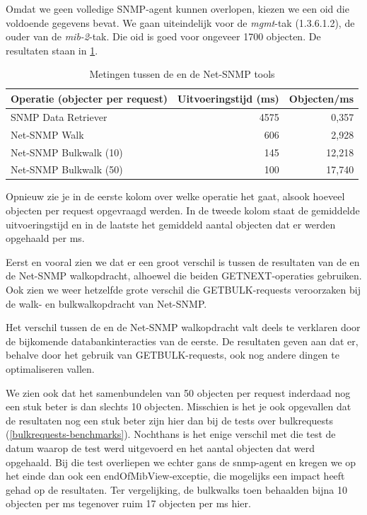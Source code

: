 Omdat we geen volledige SNMP-agent kunnen overlopen, kiezen we een \gls{oid} die voldoende gegevens bevat.
We gaan uiteindelijk voor de \textit{mgmt}-tak (1.3.6.1.2), de ouder van de \textit{mib-2}-tak.
Die \gls{oid} is goed voor ongeveer 1700 objecten.
De resultaten staan in \cref{tabel-nwmretriever-vs-net-snmp}.

\begin{table}[h]
\centering
\begin{tabular}{@{}lrr@{}}
\toprule
Operatie (objecter per request) & Uitvoeringstijd (ms) & Objecten/ms \\ \midrule
SNMP Data Retriever             & 4575                 & 0,357       \\
Net-SNMP Walk                   & 606                  & 2,928       \\
Net-SNMP Bulkwalk (10)          & 145                  & 12,218      \\
Net-SNMP Bulkwalk (50)          & 100                  & 17,740      \\ \bottomrule
\end{tabular}
\caption{Metingen tussen de \nwmretriever{} en de Net-SNMP tools}
\label{tabel-nwmretriever-vs-net-snmp}
\end{table}

Opnieuw zie je in de eerste kolom over welke operatie het gaat, alsook hoeveel objecten per request opgevraagd werden.
In de tweede kolom staat de gemiddelde uitvoeringstijd en in de laatste het gemiddeld aantal objecten dat er werden opgehaald per ms.

Eerst en vooral zien we dat er een groot verschil is tussen de resultaten van de \nwmretriever{}
en de Net-SNMP walkopdracht, alhoewel die beiden GETNEXT-operaties gebruiken.
Ook zien we weer hetzelfde grote verschil die GETBULK-requests veroorzaken bij de walk- en bulkwalkopdracht van Net-SNMP.

Het verschil tussen de \nwmretriever{} en de Net-SNMP walkopdracht valt deels te verklaren door de bijkomende databankinteracties van de eerste.
De resultaten geven aan dat er, behalve door het gebruik van GETBULK-requests, ook nog andere dingen te optimaliseren vallen.

We zien ook dat het samenbundelen van 50 objecten per request inderdaad nog een stuk beter is dan slechts 10 objecten.
Misschien is het je ook opgevallen dat de resultaten nog een stuk beter zijn hier dan bij de tests over bulkrequests (\cref{bulkrequests-benchmarks}).
Nochthans is het enige verschil met die test de datum waarop de test werd uitgevoerd en het aantal objecten dat werd opgehaald.
Bij die test overliepen we echter gans de \gls{snmp-agent} en kregen we op het einde dan ook een endOfMibView-exceptie,
die mogelijks een impact heeft gehad op de resultaten.
Ter vergelijking, de bulkwalks toen behaalden bijna 10 objecten per ms tegenover ruim 17 objecten per ms hier.

